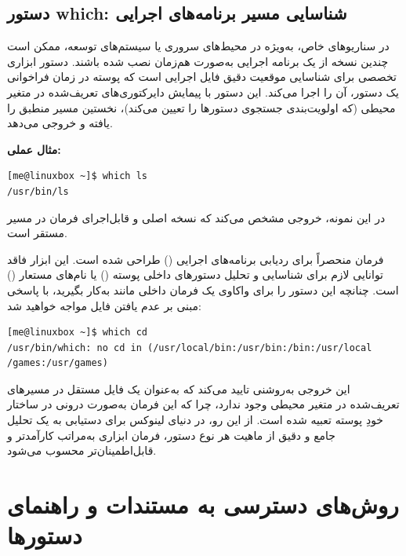 \subsection{دستور which: شناسایی مسیر برنامه‌های اجرایی}

در سناریوهای خاص، به‌ویژه در محیط‌های سروری یا سیستم‌های توسعه، ممکن است چندین نسخه از یک برنامه اجرایی به‌صورت هم‌زمان نصب شده باشند. دستور  ابزاری تخصصی برای شناسایی موقعیت دقیق فایل اجرایی است که پوسته در زمان فراخوانی یک دستور، آن را اجرا می‌کند. این دستور با پیمایش دایرکتوری‌های تعریف‌شده در متغیر محیطی  (که اولویت‌بندی جستجوی دستورها را تعیین می‌کند)، نخستین مسیر منطبق را یافته و خروجی می‌دهد.

\textbf{مثال عملی:}

\begin{latin}
\begin{lstlisting}
[me@linuxbox ~]$ which ls
/usr/bin/ls
\end{lstlisting}
\end{latin}

در این نمونه، خروجی مشخص می‌کند که نسخه اصلی و قابل‌اجرای فرمان  در مسیر  مستقر است.

فرمان  منحصراً برای ردیابی برنامه‌های اجرایی () طراحی شده است. این ابزار فاقد توانایی لازم برای شناسایی و تحلیل دستورهای داخلی پوسته () یا نام‌های مستعار () است. چنانچه این دستور را برای واکاوی یک فرمان داخلی مانند  به‌کار بگیرید، با پاسخی مبنی بر عدم یافتن فایل مواجه خواهید شد:

\begin{latin}
\begin{lstlisting}
[me@linuxbox ~]$ which cd
/usr/bin/which: no cd in (/usr/local/bin:/usr/bin:/bin:/usr/local
/games:/usr/games)
\end{lstlisting}
\end{latin}

این خروجی به‌روشنی تایید می‌کند که  به‌عنوان یک فایل مستقل در مسیرهای تعریف‌شده در متغیر محیطی  وجود ندارد، چرا که این فرمان به‌صورت درونی در ساختار خودِ پوسته تعبیه شده است. از این رو، در دنیای لینوکس برای دستیابی به یک تحلیل جامع و دقیق از ماهیت هر نوع دستور، فرمان  ابزاری به‌مراتب کارآمدتر و قابل‌اطمینان‌تر محسوب می‌شود.

\section{روش‌های دسترسی به مستندات و راهنمای دستورها}

